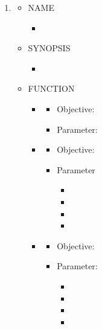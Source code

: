 \documentclass{swfcthesis}
\begin{document}
\begin{enumerate}
\begin{itemize}
\begin{itemize}
    \end{itemize}
    
  \end{itemize}


\item
  \begin{itemize}
  \item NAME
    \begin{itemize}
    \item \texttt{}
    \end{itemize}
    
  \item SYNOPSIS
    \begin{itemize}
    \item \texttt{}
    \end{itemize}
    
  \item FUNCTION
    \begin{itemize}
    \item \texttt{}
      \begin{itemize}
      \item Objective: 
        \texttt{}
      \item Parameter: 
      \end{itemize}
      
    \item \texttt{}
      \begin{itemize}
      \item Objective:
      \item Parameter
        \begin{itemize}
        \item \texttt{}
        \item
        \item
        \item
        \end{itemize}
      \end{itemize}

    \item \texttt{}
      \begin{itemize}
      \item Objective:
      \item Parameter:
        \begin{itemize}
        \item
        \item
        \item
        \item
        \end{itemize}
      \end{itemize}
      \end{itemize}
    
  \end{itemize}
  
  
\end{enumerate}
\end{document}
